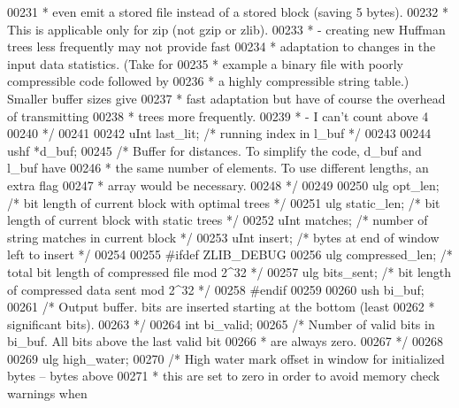 \begin{DoxyCode}
00231 \textcolor{comment}{     *     even emit a stored file instead of a stored block (saving 5 bytes).}
00232 \textcolor{comment}{     *     This is applicable only for zip (not gzip or zlib).}
00233 \textcolor{comment}{     *   - creating new Huffman trees less frequently may not provide fast}
00234 \textcolor{comment}{     *     adaptation to changes in the input data statistics. (Take for}
00235 \textcolor{comment}{     *     example a binary file with poorly compressible code followed by}
00236 \textcolor{comment}{     *     a highly compressible string table.) Smaller buffer sizes give}
00237 \textcolor{comment}{     *     fast adaptation but have of course the overhead of transmitting}
00238 \textcolor{comment}{     *     trees more frequently.}
00239 \textcolor{comment}{     *   - I can't count above 4}
00240 \textcolor{comment}{     */}
00241 
00242     uInt last\_lit;      \textcolor{comment}{/* running index in l\_buf */}
00243 
00244     ushf *d\_buf;
00245     \textcolor{comment}{/* Buffer for distances. To simplify the code, d\_buf and l\_buf have}
00246 \textcolor{comment}{     * the same number of elements. To use different lengths, an extra flag}
00247 \textcolor{comment}{     * array would be necessary.}
00248 \textcolor{comment}{     */}
00249 
00250     ulg opt\_len;        \textcolor{comment}{/* bit length of current block with optimal trees */}
00251     ulg static\_len;     \textcolor{comment}{/* bit length of current block with static trees */}
00252     uInt matches;       \textcolor{comment}{/* number of string matches in current block */}
00253     uInt insert;        \textcolor{comment}{/* bytes at end of window left to insert */}
00254 
00255 \textcolor{preprocessor}{#ifdef ZLIB\_DEBUG}
00256     ulg compressed\_len; \textcolor{comment}{/* total bit length of compressed file mod 2^32 */}
00257     ulg bits\_sent;      \textcolor{comment}{/* bit length of compressed data sent mod 2^32 */}
00258 \textcolor{preprocessor}{#endif}
00259 
00260     ush bi\_buf;
00261     \textcolor{comment}{/* Output buffer. bits are inserted starting at the bottom (least}
00262 \textcolor{comment}{     * significant bits).}
00263 \textcolor{comment}{     */}
00264     \textcolor{keywordtype}{int} bi\_valid;
00265     \textcolor{comment}{/* Number of valid bits in bi\_buf.  All bits above the last valid bit}
00266 \textcolor{comment}{     * are always zero.}
00267 \textcolor{comment}{     */}
00268 
00269     ulg high\_water;
00270     \textcolor{comment}{/* High water mark offset in window for initialized bytes -- bytes above}
00271 \textcolor{comment}{     * this are set to zero in order to avoid memory check warnings when}

\end{DoxyCode}
